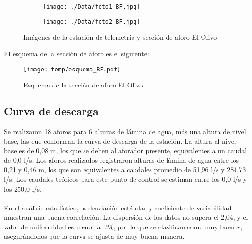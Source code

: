 \documentclass[]{article}
\begin{document}
\begin{figure}[H]
  \centering
\begin{subfigure}{.49\textwidth}
  \texttt{[image: ./Data/foto1\_BF.jpg]}
\end{subfigure}
\hfill
\begin{subfigure}{.49\textwidth}
  \texttt{[image: ./Data/foto2\_BF.jpg]}
\end{subfigure}
\caption{Imágenes de la estación de telemetría y sección de aforo El Olivo}
\label{fig:fotos_32}
\end{figure}

El esquema de la sección de aforo es el siguiente:

\begin{figure}[H]
  \centering
  \texttt{[image: temp/esquema\_BF.pdf]}
\caption{Esquema de la sección de aforo El Olivo}
\label{fig:Esquema_BF}
\end{figure}

\subsection{Curva de descarga}\label{curva-de-descarga-31}

Se realizaron 18 aforos para 6 alturas de lámina de agua, más una altura de nivel base, las que conforman la curva de descarga de la estación. La altura al nivel base es de 0,08 m, los que se deben al aforador presente, equivalentes a un caudal de 0,0 l/s. Los aforos realizados registraron alturas de lámina de agua entre los 0,21 y 0,46 m, los que son equivalentes a caudales promedio de 51,96 l/s y 284,73 l/s. Los caudales teóricos para este punto de control se estiman entre los 0,0 l/s y los 250,0 l/s.\\
\\
En el análisis estadístico, la desviación estándar y coeficiente de variabilidad muestran una buena correlación. La dispersión de los datos no supera el 2,04, y el valor de uniformidad es menor al 2\%, por lo que se clasifican como muy buenos, asegurándonos que la curva se ajusta de muy buena manera.
\end{document}

